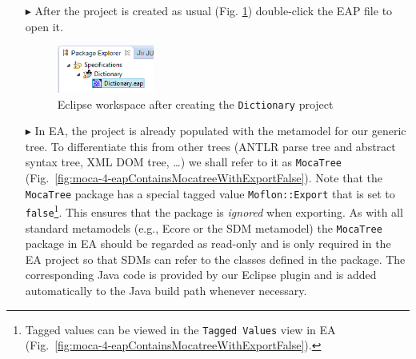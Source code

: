\begin{enumerate}
\item[$\blacktriangleright$] After the project is created as usual (Fig. \ref{fig:moca-3-NewWizardResult}) double-click the EAP file to open it. 

\begin{figure}[!htbp]
\begin{center}
 \includegraphics[width=0.3\textwidth]{pics/moca/1DictionaryMetaModel/3-WizardResult}
  \caption{Eclipse workspace after creating the \texttt{Dictionary} project}
  \label{fig:moca-3-NewWizardResult}
\end{center}
\end{figure}

\item[$\blacktriangleright$] In EA, the project is already populated with the metamodel for our generic tree.
To differentiate this from other trees (ANTLR parse tree and abstract syntax tree, XML DOM tree, \ldots) we shall refer to it as \texttt{MocaTree} (Fig.~\ref{fig:moca-4-eapContainsMocatreeWithExportFalse}).
Note that the \texttt{MocaTree} package has a special tagged value \texttt{Moflon::Export} that is set to \texttt{false}\footnote{Tagged values can be viewed in the \texttt{Tagged Values} view in EA (Fig.~\ref{fig:moca-4-eapContainsMocatreeWithExportFalse}).}.
This ensures that the package is \emph{ignored} when exporting.
As with all standard metamodels (e.g., Ecore or the SDM metamodel) the \texttt{MocaTree} package in EA should be regarded as read-only and is only required in the EA project so that SDMs can refer to the classes defined in the package.
The corresponding Java code is provided by our Eclipse plugin and is added automatically to the Java build path whenever necessary.


\end{enumerate}
